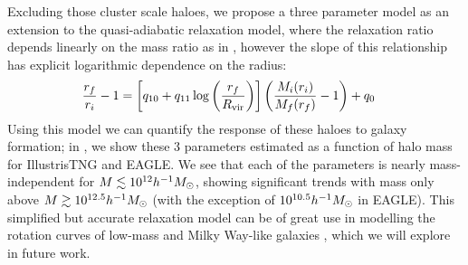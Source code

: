 Excluding those cluster scale haloes, we propose a three parameter model as an extension to the quasi-adiabatic relaxation model, where the relaxation ratio depends linearly on the mass ratio as in , however the slope of this relationship has explicit logarithmic dependence on the radius:
\begin{align}
\label{eq:q3-model-ch:simbase}
\frac{r_f}{r_i} - 1 &=  \left[ q_{10} + q_{11} \log \left( \frac{r_f}{R_{\rm vir}} \right) \right] \left( \frac{M_i(r_i)}{M_f(r_f)} - 1 \right) + q_0
\end{align}
Using this model we can quantify the response of these haloes to galaxy formation;
in , we show these 3 parameters estimated as a function of halo mass for IllustrisTNG and EAGLE. We see that each of the parameters is nearly mass-independent for $M\lesssim10^{12}h^{-1}M_{\odot}$, showing significant trends with mass only above $M\gtrsim10^{12.5}h^{-1}M_{\odot}$ (with the exception of $10^{10.5} h^{-1}M_{\odot}$ in EAGLE). This simplified but accurate relaxation model can be of great use in modelling the rotation curves of low-mass and Milky Way-like galaxies \citep{2021MNRAS.503.4147P,2021MNRAS.507..632P}, which we will explore in future work.

